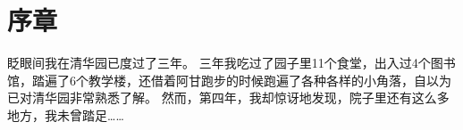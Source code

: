\chapter{序章}

眨眼间我在清华园已度过了三年。
三年我吃过了园子里11个食堂，出入过4个图书馆，踏遍了6个教学楼，还借着阿甘跑步的时候跑遍了各种各样的小角落，自以为已对清华园非常熟悉了解。
然而，第四年，我却惊讶地发现，院子里还有这么多地方，我未曾踏足……

% 
